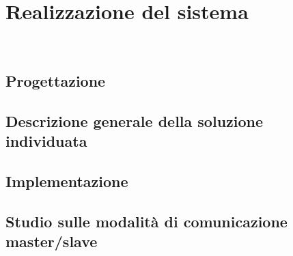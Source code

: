 
\pagestyle{IHA-fancy-style}
\chapter{Realizzazione del sistema}
\label{cap:realizzazione-del-sistema}

\\

\section{Progettazione}

\section{Descrizione generale della soluzione individuata}

\section{Implementazione}

\section{Studio sulle modalità di comunicazione master/slave}
